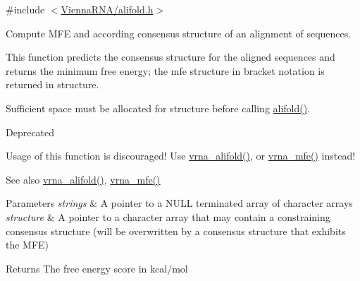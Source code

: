 {\ttfamily \#include $<$\mbox{\hyperlink{alifold_8h}{Vienna\+R\+N\+A/alifold.\+h}}$>$}



Compute M\+FE and according consensus structure of an alignment of sequences. 

This function predicts the consensus structure for the aligned \textquotesingle{}sequences\textquotesingle{} and returns the minimum free energy; the mfe structure in bracket notation is returned in \textquotesingle{}structure\textquotesingle{}.

Sufficient space must be allocated for \textquotesingle{}structure\textquotesingle{} before calling \mbox{\hyperlink{group__consensus__mfe__fold_ga4cf00f0659e5f0480335d69e797f05b1}{alifold()}}.

\begin{DoxyRefDesc}{Deprecated}
\item[\mbox{\hyperlink{deprecated__deprecated000012}{Deprecated}}]Usage of this function is discouraged! Use \mbox{\hyperlink{group__consensus__mfe__fold_ga6c9d3bef3e92c6d423ffac9f981418c1}{vrna\+\_\+alifold()}}, or \mbox{\hyperlink{group__mfe__fold_gabd3b147371ccf25c577f88bbbaf159fd}{vrna\+\_\+mfe()}} instead! \end{DoxyRefDesc}
\begin{DoxySeeAlso}{See also}
\mbox{\hyperlink{group__consensus__mfe__fold_ga6c9d3bef3e92c6d423ffac9f981418c1}{vrna\+\_\+alifold()}}, \mbox{\hyperlink{group__mfe__fold_gabd3b147371ccf25c577f88bbbaf159fd}{vrna\+\_\+mfe()}}
\end{DoxySeeAlso}

\begin{DoxyParams}{Parameters}
{\em strings} & A pointer to a N\+U\+LL terminated array of character arrays \\
\hline
{\em structure} & A pointer to a character array that may contain a constraining consensus structure (will be overwritten by a consensus structure that exhibits the M\+FE) \\
\hline
\end{DoxyParams}
\begin{DoxyReturn}{Returns}
The free energy score in kcal/mol 
\end{DoxyReturn}
\mbox{\label{group__consensus__mfe__fold_gadbd3b0b1c144cbfb4efe704b2b260f96}} 
